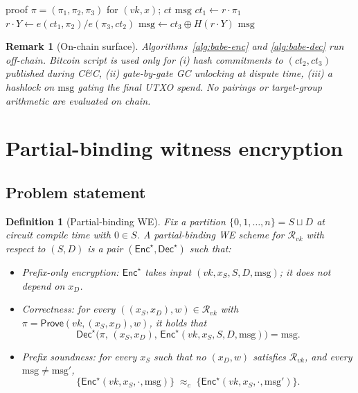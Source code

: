 \documentclass[11pt]{article}
\newtheorem{definition}{Definition}
\newtheorem{remark}{Remark}
\newcommand{\msg}{\mathrm{msg}}
\newcommand{\Enc}{\mathsf{Enc}}
\newcommand{\Dec}{\mathsf{Dec}}
\begin{document}
\begin{algorithm}[H]
\caption{BABE $\Dec(\pi, ct)$ \hfill{\footnotesize Prover, off-chain, $T_1$}}
\label{alg:babe-dec}
\begin{algorithmic}[1]
\Require proof $\pi = (\pi_1, \pi_2, \pi_3)$ for $(vk, x)$; $ct$
\Ensure $\msg$
\State $ct_1 \gets r \cdot \pi_1$ 
\State $r \cdot Y \gets e(ct_1, \pi_2) / e(\pi_3, ct_2)$ 
\State $\msg \gets ct_3 \oplus H(r \cdot Y)$
\State \Return $\msg$
\end{algorithmic}
\end{algorithm}

\begin{remark}[On-chain surface]
Algorithms~\ref{alg:babe-enc} and \ref{alg:babe-dec} run off-chain.
Bitcoin script is used only for (i) hash commitments to
$(ct_2, ct_3)$ published during C\&C, (ii) gate-by-gate GC unlocking
at dispute time, (iii) a hashlock on $\msg$ gating the final UTXO
spend. No pairings or target-group arithmetic are evaluated on chain.
\end{remark}

\section{Partial-binding witness encryption}\label{sec:construction}

\subsection{Problem statement}

\begin{definition}[Partial-binding WE]\label{def:pbwe}
Fix a partition $\{0, 1, \ldots, n\} = S \sqcup D$ at circuit
compile time with $0 \in S$. A partial-binding WE scheme for
$\mathcal{R}_{vk}$ with respect to $(S, D)$ is a pair
$(\Enc^\star, \Dec^\star)$ such that:
\begin{itemize}
  \item \emph{Prefix-only encryption:} $\Enc^\star$ takes input
    $(vk, x_S, S, D, \msg)$; it does not depend on $x_D$.
  \item \emph{Correctness:} for every $((x_S, x_D), w) \in \mathcal{R}_{vk}$
    with $\pi = \mathsf{Prove}(vk, (x_S, x_D), w)$, it holds that
    \[
      \Dec^\star\bigl(\pi,\,(x_S, x_D),\,\Enc^\star(vk, x_S, S, D, \msg)\bigr) = \msg.
    \]
  \item \emph{Prefix soundness:} for every $x_S$ such that no
    $(x_D, w)$ satisfies $\mathcal{R}_{vk}$, and every $\msg \neq \msg'$,
    \[
      \{\Enc^\star(vk, x_S, \cdot, \msg)\}
      \;\approx_c\;
      \{\Enc^\star(vk, x_S, \cdot, \msg')\}.
    \]
\end{itemize}
\end{definition}
\end{document}
